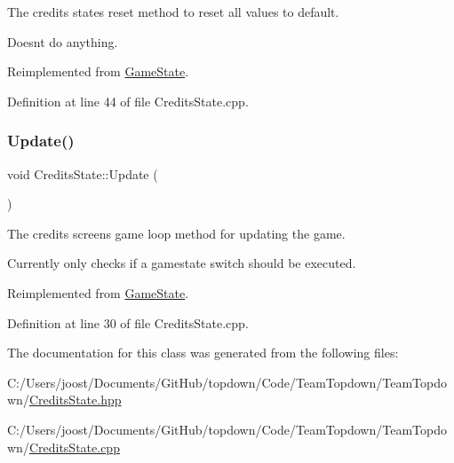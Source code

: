 The credits state\textquotesingle{}s reset method to reset all values to default. 

Doesn\textquotesingle{}t do anything. 

Reimplemented from \hyperlink{class_game_state_a46ac6317883dff0eba4f8f305af6b6bb}{Game\+State}.



Definition at line 44 of file Credits\+State.\+cpp.

\mbox{\label{class_credits_state_a565adc4ac454f23941c5db684da56ad7}} 
\subsubsection{\texorpdfstring{Update()}{Update()}}
{\footnotesize\ttfamily void Credits\+State\+::\+Update (\begin{DoxyParamCaption}{ }\end{DoxyParamCaption})\hspace{0.3cm}{\ttfamily [virtual]}}



The credits screen\textquotesingle{}s game loop method for updating the game. 

Currently only checks if a gamestate switch should be executed. 

Reimplemented from \hyperlink{class_game_state_a5be51b634f95bc6e57066ad6931aa18b}{Game\+State}.



Definition at line 30 of file Credits\+State.\+cpp.



The documentation for this class was generated from the following files\+:\begin{DoxyCompactItemize}
\item 
C\+:/\+Users/joost/\+Documents/\+Git\+Hub/topdown/\+Code/\+Team\+Topdown/\+Team\+Topdown/\hyperlink{_credits_state_8hpp}{Credits\+State.\+hpp}\item 
C\+:/\+Users/joost/\+Documents/\+Git\+Hub/topdown/\+Code/\+Team\+Topdown/\+Team\+Topdown/\hyperlink{_credits_state_8cpp}{Credits\+State.\+cpp}\end{DoxyCompactItemize}
